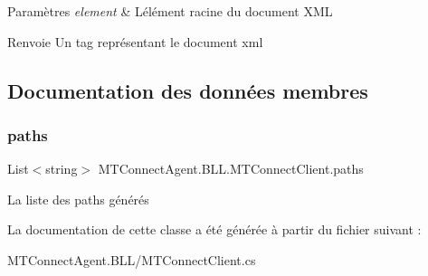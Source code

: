 \begin{DoxyParams}{Paramètres}
{\em element} & L\textquotesingle{}élément racine du document X\+ML\\
\hline
\end{DoxyParams}
\begin{DoxyReturn}{Renvoie}
Un tag représentant le document xml
\end{DoxyReturn}


\subsection{Documentation des données membres}
\mbox{\label{class_m_t_connect_agent_1_1_b_l_l_1_1_m_t_connect_client_ad1f188c1a4cd646e7630866643045d34}} 
\subsubsection{\texorpdfstring{paths}{paths}}
{\footnotesize\ttfamily List$<$string$>$ M\+T\+Connect\+Agent.\+B\+L\+L.\+M\+T\+Connect\+Client.\+paths\hspace{0.3cm}{\ttfamily [private]}}



La liste des paths générés 



La documentation de cette classe a été générée à partir du fichier suivant \+:\begin{DoxyCompactItemize}
\item 
M\+T\+Connect\+Agent.\+B\+L\+L/M\+T\+Connect\+Client.\+cs\end{DoxyCompactItemize}
